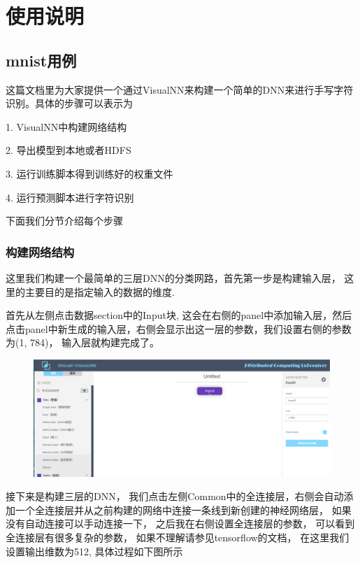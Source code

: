 \documentclass{progbookcn}
\begin{document}
\part{使用说明}


\chapter{mnist用例}

这篇文档里为大家提供一个通过VisualNN来构建一个简单的DNN来进行手写字符识别。具体的步骤可以表示为

1. VisualNN中构建网络结构

2. 导出模型到本地或者HDFS

3. 运行训练脚本得到训练好的权重文件

4. 运行预测脚本进行字符识别
   
   下面我们分节介绍每个步骤




\section{构建网络结构}

这里我们构建一个最简单的三层DNN的分类网路，首先第一步是构建输入层， 这里的主要目的是指定输入的数据的维度.

首先从左侧点击数据section中的Input块, 这会在右侧的panel中添加输入层，然后点击panel中新生成的输入层，右侧会显示出这一层的参数，我们设置右侧的参数为(1, 784)， 输入层就构建完成了。

\begin{figure}[H]
  \centering
  \includegraphics[width=0.98\linewidth]{example_input.png}
\end{figure}


接下来是构建三层的DNN， 我们点击左侧Common中的全连接层，右侧会自动添加一个全连接层并从之前构建的网络中连接一条线到新创建的神经网络层， 如果没有自动连接可以手动连接一下， 之后我在右侧设置全连接层的参数， 可以看到全连接层有很多复杂的参数， 如果不理解请参见tensorflow的文档， 在这里我们设置输出维数为512, 具体过程如下图所示
\end{document}
